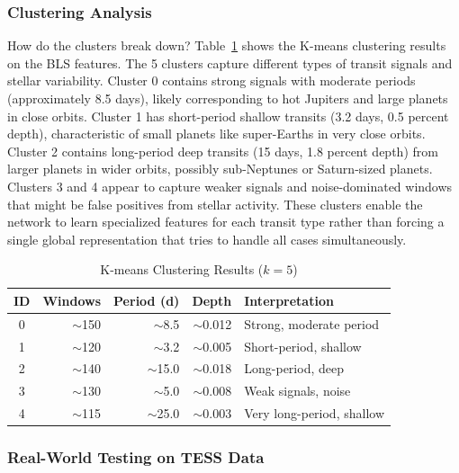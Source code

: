 \documentclass[letterpaper]{article} %
\begin{document}
\subsubsection{Clustering Analysis}

How do the clusters break down? Table~\ref{tab:bilstm_clusters} shows the K-means clustering results on the BLS features. The 5 clusters capture different types of transit signals and stellar variability. Cluster 0 contains strong signals with moderate periods (approximately 8.5 days), likely corresponding to hot Jupiters and large planets in close orbits. Cluster 1 has short-period shallow transits (3.2 days, 0.5 percent depth), characteristic of small planets like super-Earths in very close orbits. Cluster 2 contains long-period deep transits (15 days, 1.8 percent depth) from larger planets in wider orbits, possibly sub-Neptunes or Saturn-sized planets. Clusters 3 and 4 appear to capture weaker signals and noise-dominated windows that might be false positives from stellar activity. These clusters enable the network to learn specialized features for each transit type rather than forcing a single global representation that tries to handle all cases simultaneously.

\begin{table}[h]
\centering
\caption{K-means Clustering Results ($k=5$)}
\label{tab:bilstm_clusters}
\begin{tabular}{@{}crrrp{3.2cm}@{}}
\toprule
\textbf{ID} & \textbf{Windows} & \textbf{Period (d)} & \textbf{Depth} & \textbf{Interpretation} \\
\midrule
0 & $\sim$150 & $\sim$8.5 & $\sim$0.012 & Strong, moderate period \\
1 & $\sim$120 & $\sim$3.2 & $\sim$0.005 & Short-period, shallow \\
2 & $\sim$140 & $\sim$15.0 & $\sim$0.018 & Long-period, deep \\
3 & $\sim$130 & $\sim$5.0 & $\sim$0.008 & Weak signals, noise \\
4 & $\sim$115 & $\sim$25.0 & $\sim$0.003 & Very long-period, shallow \\
\bottomrule
\end{tabular}
\end{table}

\subsubsection{Real-World Testing on TESS Data}
\end{document}
